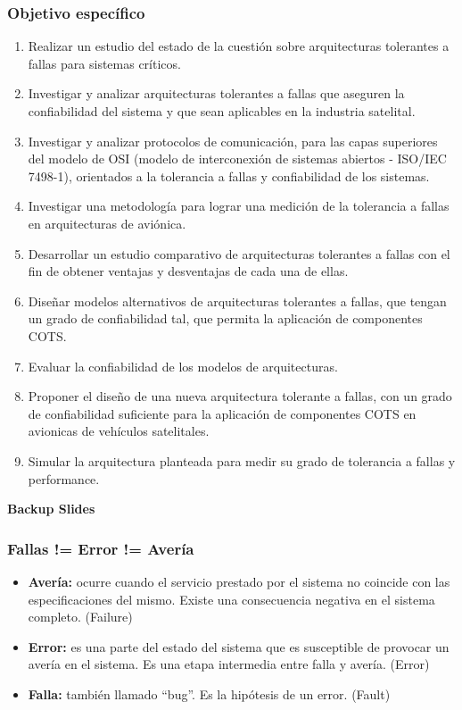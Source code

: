 \begin{frame}[allowframebreaks]
	\frametitle{Objetivo específico}
	\begin{enumerate}
		\item Realizar un estudio del estado de la cuestión sobre arquitecturas tolerantes a fallas para sistemas críticos.
		\item Investigar y analizar arquitecturas tolerantes a fallas que aseguren la confiabilidad del sistema y que sean aplicables en la industria satelital.
		\item Investigar y analizar protocolos de comunicación, para las capas superiores del modelo de OSI (modelo de interconexión de sistemas abiertos - ISO/IEC 7498-1), orientados a la tolerancia a fallas y confiabilidad de los sistemas. 
		\item Investigar una metodología para lograr una medición de la tolerancia a fallas en arquitecturas de aviónica.
		\item Desarrollar un estudio comparativo de arquitecturas tolerantes a fallas con el fin de obtener ventajas y desventajas de cada una de ellas.
		\item Diseñar modelos alternativos de arquitecturas tolerantes a fallas, que tengan un grado de confiabilidad tal, que permita la aplicación de componentes COTS.
		\item Evaluar la confiabilidad de los modelos de arquitecturas.
		\item Proponer el diseño de una nueva arquitectura tolerante a fallas, con un grado de confiabilidad suficiente para la aplicación de componentes COTS en avionicas de vehículos satelitales.
		\item Simular la arquitectura planteada para medir su grado de tolerancia a fallas y performance.
	\end{enumerate}
\end{frame}

\begin{frame}[noframenumbering, c]
	\LARGE
	\centering
	\textbf{Backup Slides}
\end{frame}

\begin{frame}
	\frametitle{Fallas != Error != Avería}
	\begin{itemize}
		\item \textbf{Avería:} ocurre cuando el servicio prestado por el sistema no coincide con las especificaciones del mismo.  Existe una consecuencia negativa en el sistema completo. (Failure)
		\item \textbf{Error:} es una parte del estado del sistema que es susceptible de provocar un avería en el sistema. Es una etapa intermedia entre falla y avería. (Error)
		\item \textbf{Falla:} también llamado “bug”. Es la hipótesis de un error. (Fault)
	\end{itemize}
\end{frame}

